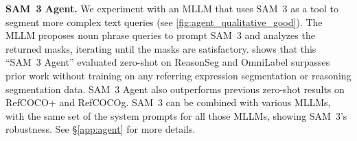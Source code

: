 \documentclass[]{fairmeta}
\newcommand{\model}{SAM~3\xspace}
\renewcommand{\paragraph}[1]{%
	\noindent\textbf{#1.}\noindent\xspace%
}
\begin{document}
	\paragraph{\model Agent}\label{sec:agent_results}
	We experiment with an MLLM that uses \model as a tool to segment more complex text queries (see \cref{fig:agent_qualitative_good}).
	The MLLM proposes noun phrase queries to prompt \model and analyzes the returned masks, iterating until the masks are satisfactory. 
	 shows that this ``\model Agent'' evaluated zero-shot on ReasonSeg and OmniLabel surpasses prior work without training on any referring expression segmentation or reasoning segmentation data. \model Agent also outperforms previous zero-shot results on RefCOCO+ and RefCOCOg. \model can be combined with various MLLMs, with the same set of the system prompts for all those MLLMs, showing \model's robustness. See \S\ref{app:agent} for more details.
	
	
	
		
			
\end{document}
